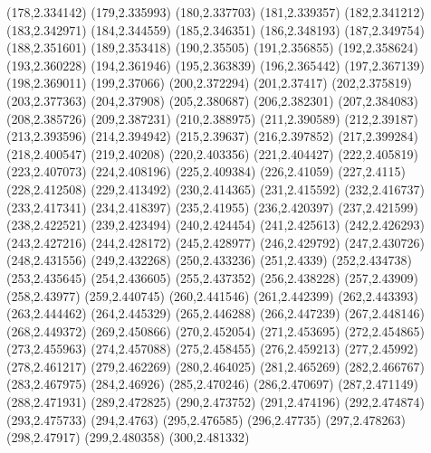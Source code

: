 (178,2.334142)
(179,2.335993)
(180,2.337703)
(181,2.339357)
(182,2.341212)
(183,2.342971)
(184,2.344559)
(185,2.346351)
(186,2.348193)
(187,2.349754)
(188,2.351601)
(189,2.353418)
(190,2.35505)
(191,2.356855)
(192,2.358624)
(193,2.360228)
(194,2.361946)
(195,2.363839)
(196,2.365442)
(197,2.367139)
(198,2.369011)
(199,2.37066)
(200,2.372294)
(201,2.37417)
(202,2.375819)
(203,2.377363)
(204,2.37908)
(205,2.380687)
(206,2.382301)
(207,2.384083)
(208,2.385726)
(209,2.387231)
(210,2.388975)
(211,2.390589)
(212,2.39187)
(213,2.393596)
(214,2.394942)
(215,2.39637)
(216,2.397852)
(217,2.399284)
(218,2.400547)
(219,2.40208)
(220,2.403356)
(221,2.404427)
(222,2.405819)
(223,2.407073)
(224,2.408196)
(225,2.409384)
(226,2.41059)
(227,2.4115)
(228,2.412508)
(229,2.413492)
(230,2.414365)
(231,2.415592)
(232,2.416737)
(233,2.417341)
(234,2.418397)
(235,2.41955)
(236,2.420397)
(237,2.421599)
(238,2.422521)
(239,2.423494)
(240,2.424454)
(241,2.425613)
(242,2.426293)
(243,2.427216)
(244,2.428172)
(245,2.428977)
(246,2.429792)
(247,2.430726)
(248,2.431556)
(249,2.432268)
(250,2.433236)
(251,2.4339)
(252,2.434738)
(253,2.435645)
(254,2.436605)
(255,2.437352)
(256,2.438228)
(257,2.43909)
(258,2.43977)
(259,2.440745)
(260,2.441546)
(261,2.442399)
(262,2.443393)
(263,2.444462)
(264,2.445329)
(265,2.446288)
(266,2.447239)
(267,2.448146)
(268,2.449372)
(269,2.450866)
(270,2.452054)
(271,2.453695)
(272,2.454865)
(273,2.455963)
(274,2.457088)
(275,2.458455)
(276,2.459213)
(277,2.45992)
(278,2.461217)
(279,2.462269)
(280,2.464025)
(281,2.465269)
(282,2.466767)
(283,2.467975)
(284,2.46926)
(285,2.470246)
(286,2.470697)
(287,2.471149)
(288,2.471931)
(289,2.472825)
(290,2.473752)
(291,2.474196)
(292,2.474874)
(293,2.475733)
(294,2.4763)
(295,2.476585)
(296,2.47735)
(297,2.478263)
(298,2.47917)
(299,2.480358)
(300,2.481332)
